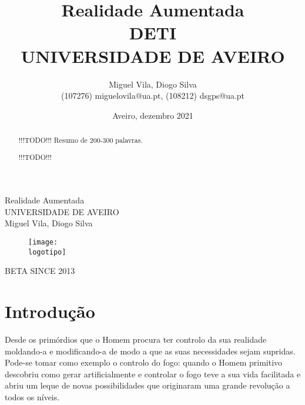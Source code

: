 \documentclass{report}
\begin{document}
\def\titulo{Realidade Aumentada}
\def\data{Aveiro, dezembro 2021}
\def\autores{Miguel Vila, Diogo Silva}
\def\autorescontactos{(107276) miguelovila@ua.pt, (108212) dsgps@ua.pt}
\def\versao{BETA SINCE 2013}
\def\departamento{DETI}
\def\empresa{UNIVERSIDADE DE AVEIRO}
\def\logotipo{ua.pdf}

\begin{titlepage}
\begin{center}
\vspace*{50mm}
{\Huge \titulo}\\ 
\vspace{10mm}
{\Large \empresa}\\
\vspace{10mm}
{\LARGE \autores}\\ 
\vspace{30mm}
\begin{figure}[h]
\center
\texttt{[image: \\logotipo]}
\end{figure}
\vspace{30mm}
\end{center}
\begin{flushright}
\versao
\end{flushright}
\end{titlepage}

\title{%
{\Huge\textbf{\titulo}}\\
{\Large \departamento\\ \empresa}
}
\author{
    \autores \\
    \autorescontactos
}
\date{\data}
\maketitle
{}

\begin{abstract}
!!!TODO!!! Resumo de 200-300 palavras.
\end{abstract}

\renewcommand{\abstractname}{Agradecimentos}
\begin{abstract}
!!!TODO!!!
\end{abstract}

\tableofcontents

\clearpage
{}

\chapter{Introdução}
\label{chap.introducao}
Desde os primórdios que o Homem procura ter controlo da sua realidade moldando-a e modificando-a de modo a que as suas necessidades sejam supridas. Pode-se tomar como exemplo o controlo do fogo: quando o Homem primitivo descobriu como gerar artificialmente e controlar o fogo teve a sua vida facilitada e abriu um leque de novas possibilidades que originaram uma grande revolução a todos os níveis.
\end{document}

